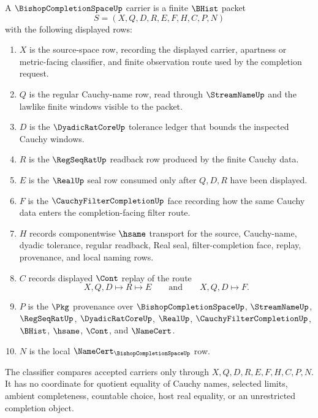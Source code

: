 \begin{definition}
\label{def:bishop-completion-space-carrier}
A $\BishopCompletionSpaceUp$ carrier is a finite $\BHist$ packet
$$
S=(X,Q,D,R,E,F,H,C,P,N)
$$
with the following displayed rows:
\begin{enumerate}
\item $X$ is the source-space row, recording the displayed carrier, apartness or metric-facing classifier, and finite observation route used by the completion request.
\item $Q$ is the regular Cauchy-name row, read through $\StreamNameUp$ and the lawlike finite windows visible to the packet.
\item $D$ is the $\DyadicRatCoreUp$ tolerance ledger that bounds the inspected Cauchy windows.
\item $R$ is the $\RegSeqRatUp$ readback row produced by the finite Cauchy data.
\item $E$ is the $\RealUp$ seal row consumed only after $Q,D,R$ have been displayed.
\item $F$ is the $\CauchyFilterCompletionUp$ face recording how the same Cauchy data enters the completion-facing filter route.
\item $H$ records componentwise $\hsame$ transport for the source, Cauchy-name, dyadic tolerance, regular readback, Real seal, filter-completion face, replay, provenance, and local naming rows.
\item $C$ records displayed $\Cont$ replay of the route
$$
X,Q,D \longmapsto R \longmapsto E
\qquad\text{and}\qquad
X,Q,D \longmapsto F .
$$
\item $P$ is the $\Pkg$ provenance over $\BishopCompletionSpaceUp$, $\StreamNameUp$, $\RegSeqRatUp$, $\DyadicRatCoreUp$, $\RealUp$, $\CauchyFilterCompletionUp$, $\BHist$, $\hsame$, $\Cont$, and $\NameCert$.
\item $N$ is the local $\NameCert_{\BishopCompletionSpaceUp}$ row.
\end{enumerate}
The classifier compares accepted carriers only through $X,Q,D,R,E,F,H,C,P,N$. It has no coordinate for quotient equality of Cauchy names, selected limits, ambient completeness, countable choice, host real equality, or an unrestricted completion object.
\end{definition}

